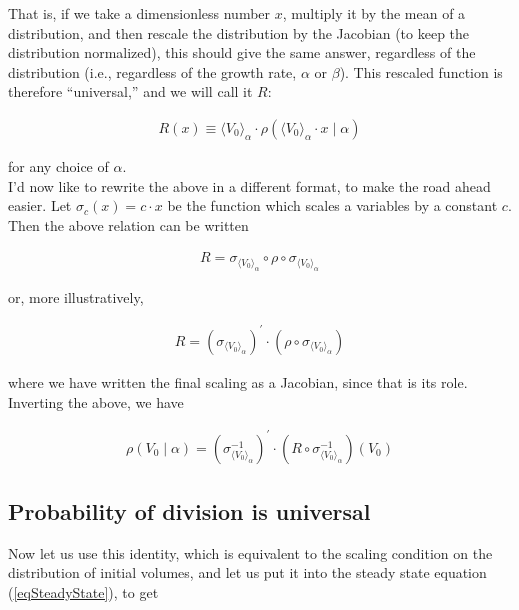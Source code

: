 \documentclass{article}
\begin{document}
That is, if we take a dimensionless number $x$, multiply it by the mean of a distribution, and then rescale the distribution by the Jacobian (to keep the distribution normalized), this should give the same answer, regardless of the distribution (i.e., regardless of the growth rate, $\alpha$ or $\beta$). This rescaled function is therefore ``universal,'' and we will call it $R$:

\begin{align}
R(x) \equiv \langle V_0 \rangle_\alpha \cdot \rho\left( \langle V_0 \rangle_\alpha \cdot x \mid  \alpha\right)
\end{align}

for any choice of $\alpha$.\\

I'd now like to rewrite the above in a different format, to make the road ahead easier. Let $\sigma_c (x) = c\cdot x$ be the function which scales a variables by a constant $c$. Then the above relation can be written

\begin{align}
R = \sigma_{\langle V_0 \rangle_\alpha} \circ \rho \circ \sigma_{\langle V_0 \rangle_\alpha}
\end{align}

or, more illustratively, 

\begin{align}
R = \left( \sigma_{\langle V_0 \rangle_\alpha} \right)^\prime \cdot (\rho \circ \sigma_{\langle V_0 \rangle_\alpha})
\end{align}

where we have written the final scaling as a Jacobian, since that is its role. Inverting the above, we have

\begin{align}
\rho(V_0 \mid \alpha) = \left(\sigma^{-1}_{\langle V_0 \rangle_\alpha}\right)^{\prime} \cdot \left( R \circ \sigma_{\langle V_0 \rangle_\alpha}^{-1} \right) (V_0)
\end{align}

\subsection{Probability of division is universal}

Now let us use this identity, which is equivalent to the scaling condition on the distribution of initial volumes, and let us put it into the steady state equation (\ref{eqSteadyState}), to get
\end{document}
